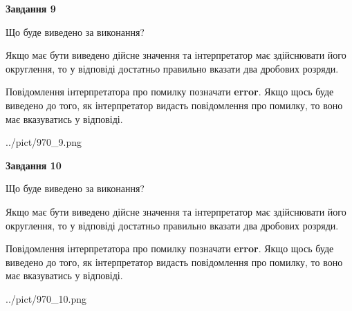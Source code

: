 \documentclass[12pt, ukrainian]{article}
\begin{document}
{\begin {Large}
{\begin {center}\textbf{Завдання 9}\end {center}}\par
Що буде виведено за виконання? \par

Якщо має бути виведено дійсне значення та інтерпретатор має здійснювати його округлення, 
то у відповіді достатньо правильно вказати два дробових розряди.

Повідомлення інтерпретатора про помилку позначати \textbf{error}.
Якщо щось буде виведено до того, як інтерпретатор видасть повідомлення про помилку, 
то воно має вказуватись у відповіді. \par

\begin{center}
	{../pict/970_9.png}
\end{center}
\newpage

{\begin {center}\textbf{Завдання 10}\end {center}}\par
Що буде виведено за виконання? \par

Якщо має бути виведено дійсне значення та інтерпретатор має здійснювати його округлення, 
то у відповіді достатньо правильно вказати два дробових розряди.

Повідомлення інтерпретатора про помилку позначати \textbf{error}.
Якщо щось буде виведено до того, як інтерпретатор видасть повідомлення про помилку, 
то воно має вказуватись у відповіді. \par

\begin{center}
	{../pict/970_10.png}
\end{center}
\newpage

\end {Large}}
\end{document}
